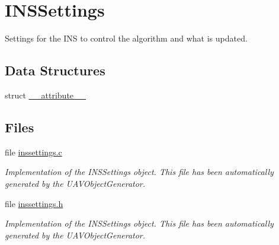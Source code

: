 \hypertarget{group___i_n_s_settings}{\section{\-I\-N\-S\-Settings}
\label{group___i_n_s_settings}
}


\-Settings for the \-I\-N\-S to control the algorithm and what is updated.  


\subsection*{\-Data \-Structures}
\begin{DoxyCompactItemize}
\item 
struct \hyperlink{struct____attribute____}{\-\_\-\-\_\-attribute\-\_\-\-\_\-}
\end{DoxyCompactItemize}
\subsection*{\-Files}
\begin{DoxyCompactItemize}
\item 
file \hyperlink{inssettings_8c}{inssettings.\-c}
\begin{DoxyCompactList}\small\item\em \-Implementation of the \-I\-N\-S\-Settings object. \-This file has been automatically generated by the \-U\-A\-V\-Object\-Generator. \end{DoxyCompactList}\item 
file \hyperlink{inssettings_8h}{inssettings.\-h}
\begin{DoxyCompactList}\small\item\em \-Implementation of the \-I\-N\-S\-Settings object. \-This file has been automatically generated by the \-U\-A\-V\-Object\-Generator. \end{DoxyCompactList}\end{DoxyCompactItemize}
